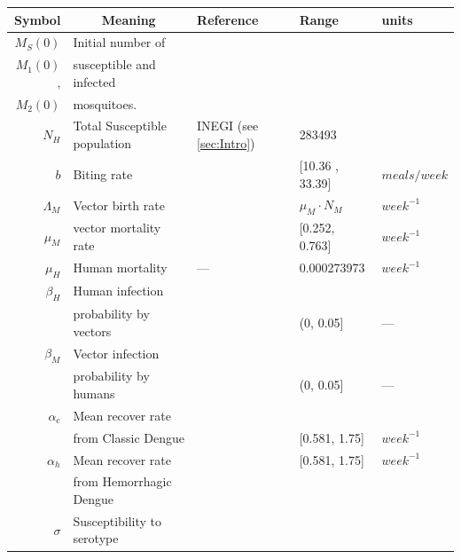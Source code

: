 
\begin{table}[htb]
		\begin{tabular}{rl m{1.9cm} ll}
			\toprule
			Symbol		&	\multicolumn{1}{c}{Meaning} &
				Reference	& Range & units
		\\
		\midrule
			$M_S(0)$
				& Initial number of
		\\
			$M_1(0)$,
				& susceptible and infected
		\\
		    $M_2(0)$
		    &  mosquitoes.
		\\
		$N_H$
		    & Total Susceptible population
		    &  INEGI (see \cref{sec:Intro})
		    & \num{283493}
		\\
			$b$
			& Biting rate
			&\cite{YasunoM1990}
			&[10.36 , 33.39] & $\si{meals \per week}$
		\\
			$\Lambda_M$
			& Vector birth rate
			&
			& $\mu_M \cdot N_M$
			& $\si{week^{-1}}$
		\\
			$\mu_M$
			& vector mortality rate
			& \cite{YANG2009}
            & [\num{0.252}, \num{0.763}]
            & $\si{week^{-1}}$
    \\
			$\mu_H$
			& Human mortality
			&---
			& \num{0.000273973}
			& $\si{week^{-1}}$
		\\
			$\beta_H$
			&	Human infection
			\\
      & probability  by vectors
			& \cite{Feng1997a}
			& (\num{0}, \num{0.05}]
			& ---
		\\
			$\beta_M$
			& Vector infection
			\\
      & probability by humans
			& \cite{Feng1997a}& (\num{0}, \num{0.05}] & ---
		\\
			$\alpha_{c}$
			& Mean recover rate
			\\
      & from Classic Dengue
			&\cite{Pinho2010}
			& [\num{0.581}, \num{1.75}] & $\si{week^{-1}}$
		\\
			$\alpha_{h}$	& Mean recover rate
			& \cite{Pinho2010}
			& [\num{0.581}, \num{1.75}]
			& $\si{week^{-1}}$
		\\
			& from Hemorrhagic Dengue
		\\
			$\sigma$
			& Susceptibility to serotype

\end{tabular}
\end{table}
